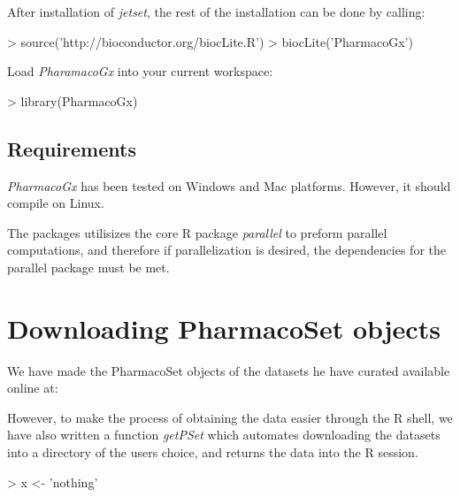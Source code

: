 \documentclass[11pt]{article}
\begin{document}
After installation of \textit{jetset}, the rest of the installation can be done by calling:

\begin{Schunk}
\begin{Sinput}
> source('http://bioconductor.org/biocLite.R')
> biocLite('PharmacoGx')
\end{Sinput}
\end{Schunk}

Load \textit{PharamacoGx} into your current workspace:
\begin{Schunk}
\begin{Sinput}
> library(PharmacoGx)
\end{Sinput}
\end{Schunk}

\subsection{Requirements}

\textit{PharmacoGx} has been tested on Windows and Mac platforms. However, it should compile on Linux. 

The packages utilisizes the core R package \textit{parallel} to preform parallel computations, and therefore if parallelization is desired, the dependencies for the parallel package must be met. 

\section{Downloading PharmacoSet objects}

We have made the PharmacoSet objects of the datasets he have curated available online at:

However, to make the process of obtaining the data easier through the R shell, we have also written a function \textit{getPSet} which automates downloading the datasets into a directory of the users choice, and returns the data into the R session. 

\begin{Schunk}
\begin{Sinput}
> x <- 'nothing'
\end{Sinput}
\end{Schunk}

\end{document}
